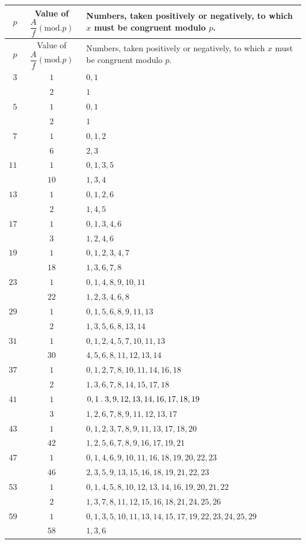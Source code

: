 \clearpage{}
\begingroup\fontsize{9.5}{12}\selectfont\setlength{\tabcolsep}{4pt}\renewcommand{\arraystretch}{1.10}
\begin{longtable}{r|c|p{262pt}}
\hline
$p$ & \shortstack{Value of\\$\dfrac{A}{f}(\mathrm{mod}.p)$} & Numbers, taken positively or negatively, to which $x$ must be congruent modulo $p$.\\\hline
\endfirsthead
$p$ & \shortstack{Value of\\$\dfrac{A}{f}(\mathrm{mod}.p)$} & Numbers, taken positively or negatively, to which $x$ must be congruent modulo $p$.\\\hline
\endhead
$3$ & $1$ & $0,1$\\
 & $2$ & $1$\\
$5$ & $1$ & $0,1$\\
 & $2$ & $1$\\
$7$ & $1$ & $0,1,2$\\
 & $6$ & $2,3$\\
$11$ & $1$ & $0,1,3,5$\\
 & $10$ & $1,3,4$\\
$13$ & $1$ & $0,1,2,6$\\
 & $2$ & $1,4,5$\\
$17$ & $1$ & $0,1,3,4,6$\\
 & $3$ & $1,2,4,6$\\
$19$ & $1$ & $0,1,2,3,4,7$\\
 & $18$ & $1,3,6,7,8$\\
$23$ & $1$ & $0,1,4,8,9,10,11$\\
 & $22$ & $1,2,3,4,6,8$\\
$29$ & $1$ & $0,1,5,6,8,9,11,13$\\
 & $2$ & $1,3,5,6,8,13,14$\\
$31$ & $1$ & $0,1,2,4,5,7,10,11,13$\\
 & $30$ & $4,5,6,8,11,12,13,14$\\
$37$ & $1$ & $0,1,2,7,8,10,11,14,16,18$\\
 & $2$ & $1,3,6,7,8,14,15,17,18$\\
$41$ & $1$ & $0,1\mathbin{.} 3,9,12,13,14,16,17,18,19$\\
 & $3$ & $1,2,6,7,8,9,11,12,13,17$\\
$43$ & $1$ & $0,1,2,3,7,8,9,11,13,17,18,20$\\
 & $42$ & $1,2,5,6,7,8,9,16,17,19,21$\\
$47$ & $1$ & $0,1,4,6,9,10,11,16,18,19,20,22,23$\\
 & $46$ & $2,3,5,9,13,15,16,18,19,21,22,23$\\
$53$ & $1$ & $0,1,4,5,8,10,12,13,14,16,19,20,21,22$\\
 & $2$ & $1,3,7,8,11,12,15,16,18,21,24,25,26$\\
$59$ & $1$ & $0,1,3,5,10,11,13,14,15,17,19,22,23,24,25,29$\\
 & $58$ & $1,3,6$\\
\end{longtable}\endgroup
